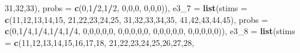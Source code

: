 \documentclass[,man,floatsintext]{apa6}
\newenvironment{Shaded}{\begin{snugshade}}{\end{snugshade}}
\newcommand{\DataTypeTok}[1]{\textcolor[rgb]{0.13,0.29,0.53}{#1}}
\newcommand{\DecValTok}[1]{\textcolor[rgb]{0.00,0.00,0.81}{#1}}
\newcommand{\KeywordTok}[1]{\textcolor[rgb]{0.13,0.29,0.53}{\textbf{#1}}}
\newcommand{\NormalTok}[1]{#1}
\newcommand{\OperatorTok}[1]{\textcolor[rgb]{0.81,0.36,0.00}{\textbf{#1}}}
\begin{document}
\begin{Shaded}
\begin{Highlighting}[]
                        \DecValTok{31}\NormalTok{,}\DecValTok{32}\NormalTok{,}\DecValTok{33}\NormalTok{),}
              \DataTypeTok{probs =} \KeywordTok{c}\NormalTok{(}\DecValTok{0}\NormalTok{,}\DecValTok{1}\OperatorTok{/}\DecValTok{2}\NormalTok{,}\DecValTok{1}\OperatorTok{/}\DecValTok{2}\NormalTok{,}
                        \DecValTok{0}\NormalTok{,}\DecValTok{0}\NormalTok{,}\DecValTok{0}\NormalTok{,}
                        \DecValTok{0}\NormalTok{,}\DecValTok{0}\NormalTok{,}\DecValTok{0}\NormalTok{)),}
  \DataTypeTok{e3_7 =}  \KeywordTok{list}\NormalTok{(}\DataTypeTok{stims =} \KeywordTok{c}\NormalTok{(}\DecValTok{11}\NormalTok{,}\DecValTok{12}\NormalTok{,}\DecValTok{13}\NormalTok{,}\DecValTok{14}\NormalTok{,}\DecValTok{15}\NormalTok{,}
                         \DecValTok{21}\NormalTok{,}\DecValTok{22}\NormalTok{,}\DecValTok{23}\NormalTok{,}\DecValTok{24}\NormalTok{,}\DecValTok{25}\NormalTok{,}
                         \DecValTok{31}\NormalTok{,}\DecValTok{32}\NormalTok{,}\DecValTok{33}\NormalTok{,}\DecValTok{34}\NormalTok{,}\DecValTok{35}\NormalTok{,}
                         \DecValTok{41}\NormalTok{,}\DecValTok{42}\NormalTok{,}\DecValTok{43}\NormalTok{,}\DecValTok{44}\NormalTok{,}\DecValTok{45}\NormalTok{),}
               \DataTypeTok{probs =} \KeywordTok{c}\NormalTok{(}\DecValTok{0}\NormalTok{,}\DecValTok{1}\OperatorTok{/}\DecValTok{4}\NormalTok{,}\DecValTok{1}\OperatorTok{/}\DecValTok{4}\NormalTok{,}\DecValTok{1}\OperatorTok{/}\DecValTok{4}\NormalTok{,}\DecValTok{1}\OperatorTok{/}\DecValTok{4}\NormalTok{,}
                         \DecValTok{0}\NormalTok{,}\DecValTok{0}\NormalTok{,}\DecValTok{0}\NormalTok{,}\DecValTok{0}\NormalTok{,}\DecValTok{0}\NormalTok{,}
                         \DecValTok{0}\NormalTok{,}\DecValTok{0}\NormalTok{,}\DecValTok{0}\NormalTok{,}\DecValTok{0}\NormalTok{,}\DecValTok{0}\NormalTok{,}
                         \DecValTok{0}\NormalTok{,}\DecValTok{0}\NormalTok{,}\DecValTok{0}\NormalTok{,}\DecValTok{0}\NormalTok{,}\DecValTok{0}\NormalTok{,}
                         \DecValTok{0}\NormalTok{,}\DecValTok{0}\NormalTok{,}\DecValTok{0}\NormalTok{,}\DecValTok{0}\NormalTok{,}\DecValTok{0}\NormalTok{)),}
  \DataTypeTok{e3_8 =}  \KeywordTok{list}\NormalTok{(}\DataTypeTok{stims =} \KeywordTok{c}\NormalTok{(}\DecValTok{11}\NormalTok{,}\DecValTok{12}\NormalTok{,}\DecValTok{13}\NormalTok{,}\DecValTok{14}\NormalTok{,}\DecValTok{15}\NormalTok{,}\DecValTok{16}\NormalTok{,}\DecValTok{17}\NormalTok{,}\DecValTok{18}\NormalTok{,}
                         \DecValTok{21}\NormalTok{,}\DecValTok{22}\NormalTok{,}\DecValTok{23}\NormalTok{,}\DecValTok{24}\NormalTok{,}\DecValTok{25}\NormalTok{,}\DecValTok{26}\NormalTok{,}\DecValTok{27}\NormalTok{,}\DecValTok{28}\NormalTok{,}

\end{Highlighting}
\end{Shaded}
\end{document}
